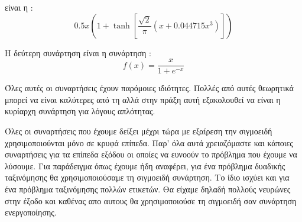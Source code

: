 είναι η :
$$0.5x\left(1+\tanh \left[\frac{\sqrt{2}}{\pi}(x+0.044715x^3)\right]\right)$$
\begin{figure}[H]
    \centering
    \caption{}
\end{figure}
Η δεύτερη συνάρτηση είναι η συνάρτηση :
$$f(x)=\frac{x}{1+e^{-x}}$$
\begin{figure}[H]
    \centering
    \caption{}
\end{figure}
Όλες αυτές οι συναρτήσεις έχουν παρόμοιες ιδιότητες. Πολλές από αυτές θεωρητικά μπορεί να είναι καλύτερες από τη  αλλά στην πράξη αυτή εξακολουθεί να είναι η κυρίαρχη συνάρτηση για λόγους απλότητας.

Όλες οι συναρτήσεις που έχουμε δείξει μέχρι τώρα με εξαίρεση την σιγμοειδή χρησιμοποιούνται μόνο σε κρυφά επίπεδα. Παρ' όλα αυτά χρειαζόμαστε και κάποιες συναρτήσεις για τα επίπεδα εξόδου οι οποίες να ευνοούν το πρόβλημα που έχουμε να
λύσουμε. Για παράδειγμα όπως έχουμε ήδη αναφέρει, για ένα πρόβλημα δυαδικής ταξινόμησης θα χρησιμοποιούσαμε τη σιγμοειδή συνάρτηση. Το ίδιο ισχύει και για ένα πρόβλημα ταξινόμησης πολλών ετικετών. Θα είχαμε δηλαδή πολλούς νευρώνες στην
έξοδο και καθένας απο αυτους θα χρησιμοποιούσε τη σιγμοειδή σαν συνάρτηση ενεργοποίησης.

